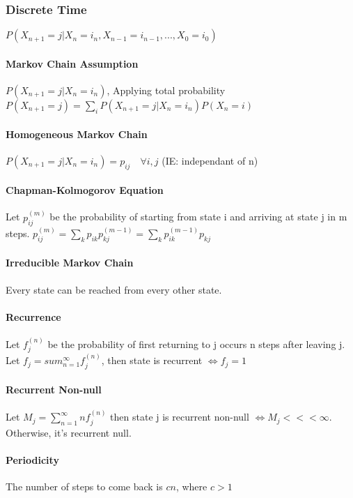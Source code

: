 

\subsubsection{Discrete Time}
$P(X_{n+1} = j | X_n = i_n , X_{n-1} = i_{n-1}, ... , X_0 = i_0)$

\paragraph{Markov Chain Assumption}
$P(X_{n+1} = j | X_n = i_n )$, Applying total probability
$P(X_{n+1} = j ) = \sum_{i} P(X_{n+1} = j |  X_n = i_n) P(X_n = i)$

\paragraph{Homogeneous Markov Chain}
$P(X_{n+1} = j | X_n = i_n ) = p_{ij} \quad \forall i,j$ (IE: independant of n)

\paragraph{Chapman-Kolmogorov Equation}
Let $p_{ij}^(m)$ be the probability of starting from state i and arriving at state j in m steps.
$p_{ij}^{(m)} = \sum_k p_{ik} p_{kj}^{(m-1)} = \sum_k p_{ik}^{(m-1)}p_{kj}$

\paragraph{Irreducible Markov Chain} Every state can be reached from every other state.

\paragraph{Recurrence}
Let $f_j^{(n)}$ be the probability of first returning to j occurs n steps after leaving j. \\
Let $f_j = sum_{n=1}^\infty f_j^{(n)}$, then
state is recurrent $\iff f_j = 1$

\paragraph{Recurrent Non-null}
Let $M_j = \sum_{n=1}^\infty n f_j^{(n)}$ then state j is recurrent non-null
$\iff M_j <<< \infty$. Otherwise, it's recurrent null.

\paragraph{Periodicity} The number of steps to come back is $cn$, where $c > 1$

